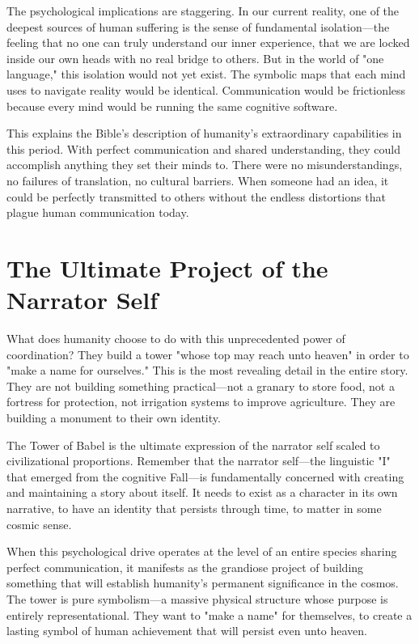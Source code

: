 The psychological implications are staggering. In our current reality, one of the deepest sources of human suffering is the sense of fundamental isolation—the feeling that no one can truly understand our inner experience, that we are locked inside our own heads with no real bridge to others. But in the world of "one language," this isolation would not yet exist. The symbolic maps that each mind uses to navigate reality would be identical. Communication would be frictionless because every mind would be running the same cognitive software.

This explains the Bible's description of humanity's extraordinary capabilities in this period. With perfect communication and shared understanding, they could accomplish anything they set their minds to. There were no misunderstandings, no failures of translation, no cultural barriers. When someone had an idea, it could be perfectly transmitted to others without the endless distortions that plague human communication today.

\section{The Ultimate Project of the Narrator Self}

What does humanity choose to do with this unprecedented power of coordination? They build a tower "whose top may reach unto heaven" in order to "make a name for ourselves." This is the most revealing detail in the entire story. They are not building something practical—not a granary to store food, not a fortress for protection, not irrigation systems to improve agriculture. They are building a monument to their own identity.

The Tower of Babel is the ultimate expression of the narrator self scaled to civilizational proportions. Remember that the narrator self—the linguistic "I" that emerged from the cognitive Fall—is fundamentally concerned with creating and maintaining a story about itself. It needs to exist as a character in its own narrative, to have an identity that persists through time, to matter in some cosmic sense.

When this psychological drive operates at the level of an entire species sharing perfect communication, it manifests as the grandiose project of building something that will establish humanity's permanent significance in the cosmos. The tower is pure symbolism—a massive physical structure whose purpose is entirely representational. They want to "make a name" for themselves, to create a lasting symbol of human achievement that will persist even unto heaven.

